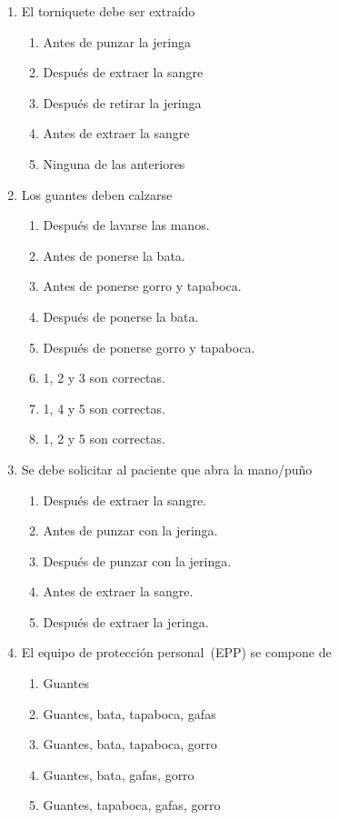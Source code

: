 \begin{enumerate}[label=\bfseries OE\arabic*.:]
\item El torniquete debe ser extraído
    \begin{enumerate}
    \item Antes de punzar la jeringa
    \item Después de extraer la sangre
    \item Después de retirar la jeringa
    \item Antes de extraer la sangre
    \item Ninguna de las anteriores
    \end{enumerate}
\item Los guantes deben calzarse
    \begin{enumerate}
    \item Después de lavarse las manos.
    \item Antes de ponerse la bata.
    \item Antes de ponerse gorro y tapaboca.
    \item Después de ponerse la bata.
    \item Después de ponerse gorro y tapaboca.
    \item 1, 2 y 3 son correctas.
    \item 1, 4 y 5 son correctas.
    \item 1, 2 y 5 son correctas.
    \end{enumerate}
\item Se debe solicitar al paciente que abra la mano/puño
    \begin{enumerate}
    \item Después de extraer la sangre.
    \item Antes de punzar con la jeringa.
    \item Después de punzar con la jeringa.
    \item Antes de extraer la sangre.
    \item Después de extraer la jeringa.
    \end{enumerate}
\item El equipo de protección personal~(EPP) se compone de
    \begin{enumerate}
    \item Guantes
    \item Guantes, bata, tapaboca, gafas
    \item Guantes, bata, tapaboca, gorro
    \item Guantes, bata, gafas, gorro
    \item Guantes, tapaboca, gafas, gorro

\end{enumerate}
\end{enumerate}
